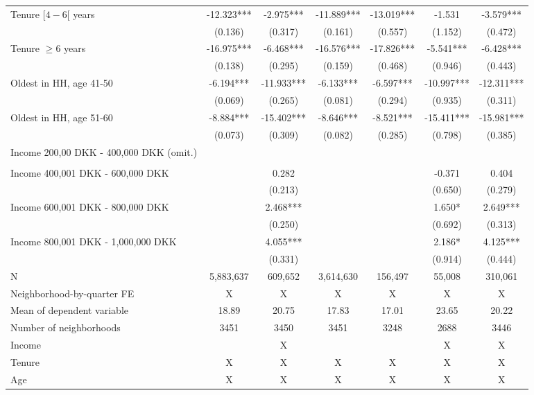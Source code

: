 \begin{tabular}{lcccccc}
Tenure $[4-6[$ years & -12.323*** & -2.975*** & -11.889*** & -13.019*** & -1.531 & -3.579*** \\ 
 & (0.136) & (0.317) & (0.161) & (0.557) & (1.152) & (0.472) \\ 
Tenure $\geq 6$ years & -16.975*** & -6.468*** & -16.576*** & -17.826*** & -5.541*** & -6.428*** \\ 
 & (0.138) & (0.295) & (0.159) & (0.468) & (0.946) & (0.443) \\ 
Oldest in HH, age 41-50 & -6.194*** & -11.933*** & -6.133*** & -6.597*** & -10.997*** & -12.311*** \\ 
 & (0.069) & (0.265) & (0.081) & (0.294) & (0.935) & (0.311) \\ 
Oldest in HH, age 51-60 & -8.884*** & -15.402*** & -8.646*** & -8.521*** & -15.411*** & -15.981*** \\ 
 & (0.073) & (0.309) & (0.082) & (0.285) & (0.798) & (0.385) \\ 
 Income 200,00 DKK - 400,000 DKK (omit.) &  & &  &  &  &  \\ 
 &  &  &  &  &  &  \\ 
 Income 400,001 DKK - 600,000 DKK &  & 0.282 &  &  & -0.371 & 0.404 \\ 
 &  & (0.213) &  &  & (0.650) & (0.279) \\ 
Income 600,001 DKK - 800,000 DKK &  & 2.468*** &  &  & 1.650* & 2.649*** \\ 
 &  & (0.250) &  &  & (0.692) & (0.313) \\ 
Income 800,001 DKK - 1,000,000 DKK &  & 4.055*** &  &  & 2.186* & 4.125*** \\ 
 &  & (0.331) &  &  & (0.914) & (0.444) \\ 
 \midrule
N & 5,883,637 & 609,652 & 3,614,630 & 156,497 & 55,008 & 310,061 \\ 
Neighborhood-by-quarter FE & X & X & X & X & X & X \\ 
Mean of dependent variable & 18.89 & 20.75 & 17.83 & 17.01 & 23.65 & 20.22 \\ 
Number of neighborhoods & 3451 & 3450 & 3451 & 3248 & 2688 & 3446 \\ 
Income &  & X &  &  & X & X \\ 
Tenure & X & X & X & X & X & X \\ 
Age & X & X & X & X & X & X \\ 
\bottomrule
\end{tabular}